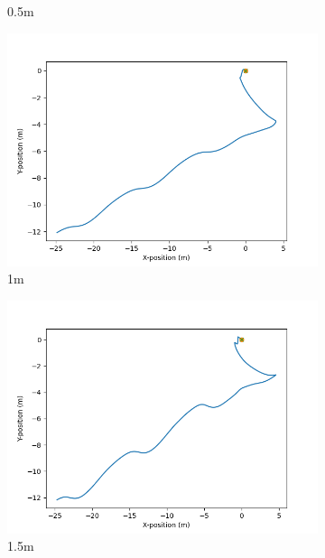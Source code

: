 \documentclass[class=article, crop=false]{standalone}
\begin{document}
\begin{figure}
\begin{subfigure}[b]{0.48\textwidth}
        \caption{0.5m}
        \label{}
    \end{subfigure}
    \vfill
    \begin{subfigure}[b]{0.48\textwidth}
        \centering
        \includegraphics{scenario1/rov-0m/1.0m/usv_position_uncontrolled}
        \caption{1m}
        \label{}
    \end{subfigure}
    \hfill
    \begin{subfigure}[b]{0.48\textwidth}
        \centering
        \includegraphics{scenario1/rov-0m/1.5m/usv_position_uncontrolled}
        \caption{1.5m}
        \label{}
    \end{subfigure}
    \vfill
    \begin{subfigure}[b]{0.48\textwidth}

\end{subfigure}
\end{figure}
\end{document}
